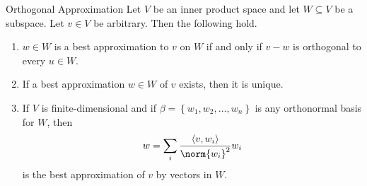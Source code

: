\documentclass[linearalgebra]{subfiles}
\begin{document}
    \begin{theorem}{Orthogonal Approximation}
        Let $V$ be an inner product space and let $W\subseteq V$ be a subspace. Let $v\in V$ be arbitrary. Then the following hold.
        \begin{enumerate}
            \item $w\in W$ is a best approximation to $v$ on $W$ if and only if $v-w$ is orthogonal to every $u\in W$.
            \item If a best approximation $w\in W$ of $v$ exists, then it is unique.
            \item If $V$ is finite-dimensional and if $\beta = \left\lbrace w_1,w_2,\ldots,w_n \right\rbrace$ is any orthonormal basis for $W$, then
                \begin{equation*}
                    w = \sum^{}_{i} \frac{\left\langle v, w_i\right\rangle }{\norm{w_i}^2}w_i
                \end{equation*}
                is the best approximation of $v$ by vectors in $W$.
        \end{enumerate}
    \end{theorem}
\end{document}
